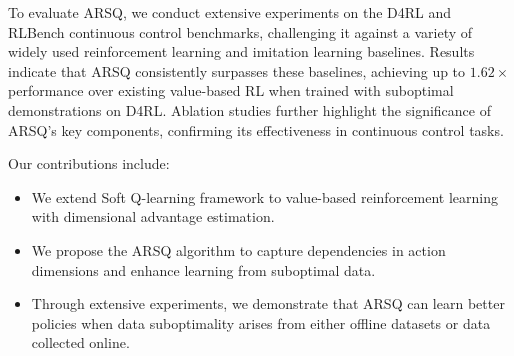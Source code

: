 To evaluate ARSQ, we conduct extensive experiments on the D4RL and RLBench continuous control benchmarks, challenging it against a variety of widely used reinforcement learning and imitation learning baselines. Results indicate that ARSQ consistently surpasses these baselines, achieving up to $1.62\times$ performance over existing value-based RL when trained with suboptimal demonstrations on D4RL. Ablation studies further highlight the significance of ARSQ’s key components, confirming its effectiveness in continuous control tasks.

Our contributions include:
\vspace{-0.5em}
\begin{itemize}
    \item We extend Soft Q-learning framework to value-based reinforcement learning with dimensional advantage estimation.
    \item We propose the ARSQ algorithm to capture dependencies in action dimensions and enhance learning from suboptimal data.
    \item Through extensive experiments, we demonstrate that ARSQ can learn better policies when data suboptimality arises from either offline datasets or data collected online.
\end{itemize}
